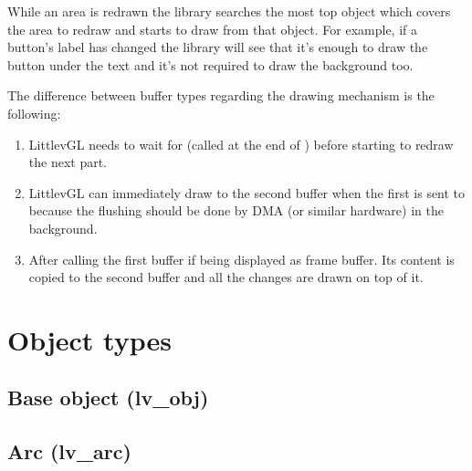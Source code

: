 \documentclass[letterpaper,10pt,english]{sphinxmanual}
\begin{document}
While an area is redrawn the library searches the most top object which covers the area to redraw and starts to draw from that object.
For example, if a button’s label has changed the library will see that it’s enough to draw the button under the text and it’s not required to draw the background too.

The difference between buffer types regarding the drawing mechanism is the following:
\begin{enumerate}
\def\theenumi{\arabic{enumi}}
\def\labelenumi{\theenumi .}
\makeatletter\def\p@enumii{\p@enumi \theenumi .}\makeatother
\item {} 
 LittlevGL needs to wait for  (called at the end of ) before starting to redraw the next part.

\item {} 
 LittlevGL can immediately draw to the second buffer when the first is sent to  because the flushing should be done by DMA (or similar hardware) in the background.

\item {} 
 After calling  the first buffer if being displayed as frame buffer. Its content is copied to the second buffer and all the changes are drawn on top of it.

\end{enumerate}


\chapter{Object types}
\label{\detokenize{object-types/index:object-types}}\label{\detokenize{object-types/index::doc}}

\section{Base object (lv\_obj)}
\label{\detokenize{object-types/obj:base-object-lv-obj}}\label{\detokenize{object-types/obj::doc}}

\section{Arc (lv\_arc)}
\label{\detokenize{object-types/arc:arc-lv-arc}}\label{\detokenize{object-types/arc::doc}}
\end{document}
